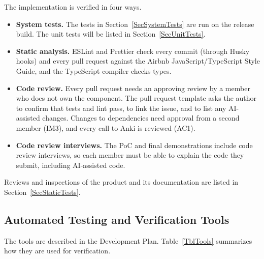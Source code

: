 \documentclass[12pt, titlepage]{article}
\begin{document}
The implementation is verified in four ways.

\begin{itemize}
  \item \textbf{System tests.} The tests in Section~\ref{SecSystemTests} are
        run on the release build. The unit tests will be listed in
        Section~\ref{SecUnitTests}.
  \item \textbf{Static analysis.} ESLint and Prettier check every commit
        (through Husky hooks) and every pull request against the Airbnb
        JavaScript/TypeScript Style Guide, and the TypeScript compiler checks
        types.
  \item \textbf{Code review.} Every pull request needs an approving review by a
        member who does not own the component. The pull request template asks
        the author to confirm that tests and lint pass, to link the issue, and
        to list any AI-assisted changes. Changes to dependencies need approval
        from a second member (IM3), and every call to Anki is reviewed
        (AC1).
  \item \textbf{Code review interviews.} The PoC and final demonstrations
        include code review interviews, so each member must be able to explain
        the code they submit, including AI-assisted code.
\end{itemize}

Reviews and inspections of the product and its documentation are listed in
Section~\ref{SecStaticTests}.

\subsection{Automated Testing and Verification Tools}\label{SecTools}

The tools are described in the Development Plan. Table~\ref{TblTools}
summarizes how they are used for verification.
\end{document}
